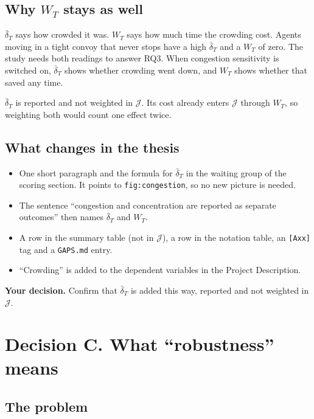 \documentclass[11pt,a4paper]{article}
\newcommand{\ask}[1]{\par\smallskip\noindent\colorbox{askbg}{\parbox{\dimexpr\linewidth-2\fboxsep}{\textbf{Your decision.} #1}}\par\smallskip}
\begin{document}
\subsection{Why $W_T$ stays as well}

$\bar\delta_T$ says how crowded it was. $W_T$ says how much time the
crowding cost. Agents moving in a tight convoy that never stops have a
high $\bar\delta_T$ and a $W_T$ of zero. The study needs both readings to
answer RQ3. When congestion sensitivity is switched on, $\bar\delta_T$
shows whether crowding went down, and $W_T$ shows whether that saved any
time.

$\bar\delta_T$ is reported and not weighted in $\mathcal{J}$. Its cost
already enters $\mathcal{J}$ through $W_T$, so weighting both would count
one effect twice.

\subsection{What changes in the thesis}

\begin{itemize}[nosep]
  \item One short paragraph and the formula for $\bar\delta_T$ in the
    waiting group of the scoring section. It points to
    \texttt{fig:congestion}, so no new picture is needed.
  \item The sentence ``congestion and concentration are reported as
    separate outcomes'' then names $\bar\delta_T$ and $W_T$.
  \item A row in the summary table (not in $\mathcal{J}$), a row in the
    notation table, an \texttt{[Axx]} tag and a \texttt{GAPS.md} entry.
  \item ``Crowding'' is added to the dependent variables in the Project
    Description.
\end{itemize}

\ask{Confirm that $\bar\delta_T$ is added this way, reported and not
weighted in $\mathcal{J}$.}

\section{Decision C. What ``robustness'' means}
\label{sec:robust}

\subsection{The problem}
\end{document}
